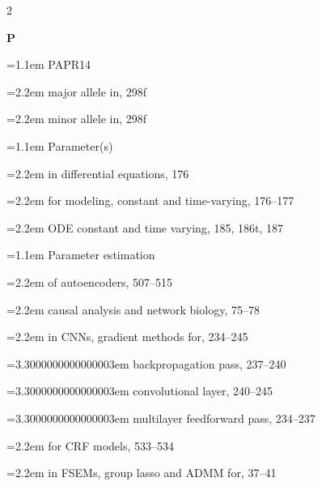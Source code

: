 \begin{multicols}{2}
\par{}\medskip\noindent\textbf{P}\par\nobreak\smallskip\nobreak
\noindent\hangindent=1.1em PAPR14\par
\noindent\hangindent=2.2em \hspace*{1.1em}major allele in, 298f\par
\noindent\hangindent=2.2em \hspace*{1.1em}minor allele in, 298f\par
\noindent\hangindent=1.1em Parameter(s)\par
\noindent\hangindent=2.2em \hspace*{1.1em}in differential equations, 176\par
\noindent\hangindent=2.2em \hspace*{1.1em}for modeling, constant and time-varying, 176--177\par
\noindent\hangindent=2.2em \hspace*{1.1em}ODE constant and time varying, 185, 186t, 187\par
\noindent\hangindent=1.1em Parameter estimation\par
\noindent\hangindent=2.2em \hspace*{1.1em}of autoencoders, 507--515\par
\noindent\hangindent=2.2em \hspace*{1.1em}causal analysis and network biology, 75--78\par
\noindent\hangindent=2.2em \hspace*{1.1em}in CNNs, gradient methods for, 234--245\par
\noindent\hangindent=3.3000000000000003em \hspace*{2.2em}backpropagation pass, 237--240\par
\noindent\hangindent=3.3000000000000003em \hspace*{2.2em}convolutional layer, 240--245\par
\noindent\hangindent=3.3000000000000003em \hspace*{2.2em}multilayer feedforward pass, 234--237\par
\noindent\hangindent=2.2em \hspace*{1.1em}for CRF models, 533--534\par
\noindent\hangindent=2.2em \hspace*{1.1em}in FSEMs, group lasso and ADMM for, 37--41\par

\end{multicols}
